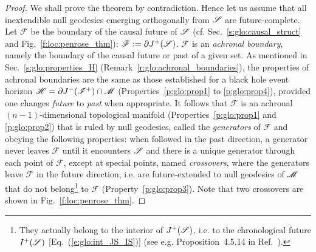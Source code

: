 \begin{proof}
We shall prove the theorem by contradiction. Hence let us assume that all
inextendible null geodesics emerging orthogonally from $\mathscr{S}$ are future-complete. Let $\mathscr{F}$
be the boundary of the causal future of $\mathscr{S}$
(cf. Sec.~\ref{s:glo:causal_struct} and Fig.~\ref{f:loc:penrose_thm}): $\mathscr{F} := \partial J^+(\mathscr{S})$.
$\mathscr{F}$ is an \emph{achronal boundary},
namely the boundary of the causal future or past of a given set.
As mentioned in Sec.~\ref{s:glo:properties_H} (Remark~\ref{r:glo:achronal_boundaries}),
the properties of achronal boundaries are the same as those established for a black hole event horizon
$\mathscr{H} = \partial J^-(\mathscr{I}^+) \cap \mathscr{M}$ (Properties~\ref{p:glo:prop1} to \ref{p:glo:prop4}),
provided one changes \emph{future} to \emph{past} when appropriate.
It follows that $\mathscr{F}$ is an achronal $(n-1)$-dimensional topological manifold
(Properties~\ref{p:glo:prop1} and \ref{p:glo:prop2}) that is ruled by null geodesics,
called the \emph{generators} of $\mathscr{F}$ and
obeying the following properties:
when followed in the past direction, a generator never leaves $\mathscr{F}$ until it encounters $\mathscr{S}$
and there is a unique generator through each point of $\mathscr{F}$, except at special
points, named \emph{crossovers}, where the generators leave
$\mathscr{F}$ in the future direction,
i.e. are future-extended to null geodesics of $\mathscr{M}$ that do not belong\footnote{They actually
belong to the interior of $J^+(\mathscr{S})$, i.e. to the chronological future $I^+(\mathscr{S})$
[Eq.~(\ref{e:glo:int_JS_IS})] (see e.g. Proposition~4.5.14 in Ref.~\cite{HawkiE73}).}
to $\mathscr{F}$ (Property~\ref{p:glo:prop3}). Note that two crossovers are shown in
Fig.~\ref{f:loc:penrose_thm}.


\end{proof}
